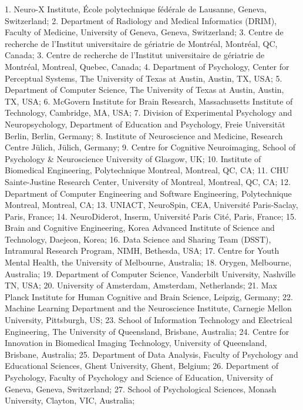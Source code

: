 \documentclass[10pt,a4paper,twocolumns]{proc}
\newcommand{\affiliations}[1]{{\scriptsize #1} \\}
\begin{document}
\affiliations{1. Neuro-X Institute, École polytechnique fédérale de Lausanne, Geneva, Switzerland; %
2. Department of Radiology and Medical Informatics (DRIM), Faculty of Medicine, University of Geneva, Geneva, Switzerland; %
3. Centre de recherche de l'Institut universitaire de gériatrie de Montréal, Montréal, QC, Canada; %
3. Centre de recherche de l'Institut universitaire de gériatrie de Montréal, Montreal, Quebec, Canada; %
4. Department of Psychology, Center for Perceptual Systems, The University of Texas at Austin, Austin, TX, USA; %
5. Department of Computer Science, The University of Texas at Austin, Austin, TX, USA; %
6. McGovern Institute for Brain Research, Massachusetts Institute of Technology, Cambridge, MA, USA; %
7. Division of Experimental Psychology and Neuropsychology, Department of Education and Psychology, Freie Universität Berlin, Berlin, Germany; %
8. Institute of Neuroscience and Medicine, Research Centre Jülich, Jülich, Germany; %
9. Centre for Cognitive Neuroimaging, School of Psychology & Neuroscience University of Glasgow, UK; %
10. Institute of Biomedical Engineering, Polytechnique Montreal, Montreal, QC, CA; %
11. CHU Sainte-Justine Research Center, University of Montreal, Montreal, QC, CA; %
12. Department of Computer Engineering and Software Engineering, Polytechnique Montreal, Montreal, CA; %
13. UNIACT, NeuroSpin, CEA, Université Paris-Saclay, Paris, France; %
14. NeuroDiderot, Inserm, Université Paris Cité, Paris, France; %
15. Brain and Cognitive Engineering, Korea Advanced Institute of Science and Technology, Daejeon, Korea; %
16. Data Science and Sharing Team (DSST), Intramural Research Program, NIMH, Bethesda, USA; %
17. Centre for Youth Mental Health, the University of Melbourne, Australia; %
18. Orygen, Melbourne, Australia; %
19. Department of Computer Science, Vanderbilt University, Nashville TN, USA; %
20. University of Amsterdam, Amsterdam, Netherlands; %
21. Max Planck Institute for Human Cognitive and Brain Science, Leipzig, Germany; %
22. Machine Learning Department and the Neuroscience Institute, Carnegie Mellon University, Pittsburgh, US; %
23. School of Information Technology and Electrical Engineering, The University of Queensland, Brisbane, Australia; %
24. Centre for Innovation in Biomedical Imaging Technology, University of Queensland, Brisbane, Australia; %
25. Department of Data Analysis, Faculty of Psychology and Educational Sciences, Ghent University, Ghent, Belgium; %
26. Department of Psychology, Faculty of Psychology and Science of Education, University of Geneva, Geneva, Switzerland; %
27. School of Psychological Sciences, Monash University, Clayton, VIC, Australia; %
}
\end{document}
